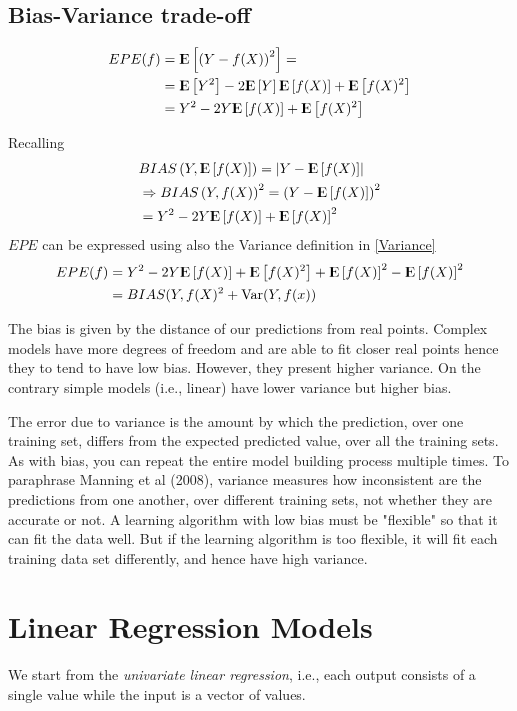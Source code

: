 \documentclass[12pt, letterpaper]{article}
\theoremstyle{definition}
\newcommand{\E}{{\rm I\kern-.3em E}}
\newcommand{\Var}{\mathrm{Var}}
\begin{document}
\subsection{Bias-Variance trade-off}
\begin{align}
EPE(f) &= \E \left[ \left( Y- f(X) \right)^2 \right] =\\
            &= \E \left[ Y^2\right] - 2 \E \left[ Y\right] \E\left[ f(X)\right] + \E\left[ f(X)^2\right]\\
             &= Y^2 - 2  Y \E\left[ f(X)\right] + \E\left[ f(X)^2\right]
\end{align}

Recalling 
\begin{align}
&BIAS\left(Y,\E\left[f(X)\right]\right) = \left| Y-\E\left[f(X)\right]\right| \\
&\Rightarrow BIAS\left(Y,f(X)\right)^2 = \left( Y-\E\left[f(X)\right]\right)^2 \\
&= Y^2 -2 Y \E\left[f(X)\right] + \E\left[f(X)\right]^2 \\
\end{align}
$EPE$ can be expressed using also the Variance definition in \ref{Variance}
\begin{align}
\label{biasVar}
EPE(f) &=  Y^2 - 2  Y \E\left[ f(X)\right] + \E\left[ f(X)^2\right] +\E\left[f(X)\right]^2-\E\left[f(X)\right]^2\\
&= BIAS(Y, f(X)^2 + \Var(Y, f(x))
\end{align}

The bias is given by the distance of our predictions from real points. Complex models have more degrees of freedom and are able to fit closer real points hence they to tend to have low bias. However, they present higher variance. On the contrary simple models (i.e., linear) have lower variance but higher bias.

The error due to variance is the amount by which the prediction, over one training set, differs from the expected predicted value, over all the training sets. As with bias, you can repeat the entire model building process multiple times. To paraphrase Manning et al (2008), variance measures how inconsistent are the predictions from one another, over different training sets, not whether they are accurate or not.  A learning algorithm with low bias must be "flexible" so that it can fit the data well. But if the learning algorithm is too flexible, it will fit each training data set differently, and hence have high variance.

\section{Linear Regression Models}
We start from the \textit{univariate linear regression}, i.e., each output consists of a single value while the input is a vector of values.
\end{document}
